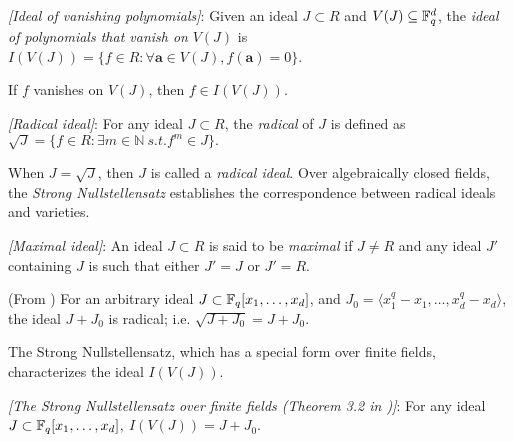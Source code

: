 \begin{Definition}{\it [Ideal of vanishing polynomials]}:
Given an ideal $J\subset R$ and $V(J) \subseteq {\mathbb{F}}_{q}^d$, the {\it ideal
of polynomials that vanish on} $V(J)$ is $I(V(J)) = \{ f \in R :
\forall \bm{a} \in V(J), f(\bm{a}) = 0\}$.
\end{Definition}

If $f$ vanishes on $V(J)$, then $f \in I(V(J))$. 

\begin{Definition}{\it [Radical ideal]}:
For any ideal $J\subset R$, the {\it radical} of $J$ is defined
as $\sqrt{J} = \{f \in R: \exists m \in \mathbb{N} ~s.t. f^m \in J\}.$
\end{Definition}

When $J = \sqrt{J}$, then $J$ is called a {\it radical ideal}.
Over algebraically closed fields, the {\it Strong Nullstellensatz}
establishes the correspondence between radical ideals and varieties. 

\begin{Definition}{\it [Maximal ideal]}: An ideal $J\subset R$ is 
said to be {\it maximal} if $J \neq R$ and any
ideal $J'$ containing $J$ is such that either $J'=J$ or $J'=R$.
\end{Definition}

\begin{Lemma}
\label{lemma:radical-ff}
(From \cite{gao:qe-gf-gb}) For an arbitrary ideal $J\subset
{\mathbb{F}}_{q}[x_1,\dots,x_d]$, and  $J_0 = \langle
x_1^q-x_1,\dots,x_d^q  -  x_d\rangle$, the ideal $J + J_0$ is radical;  
i.e. $\sqrt{J+J_0} = J+J_0$. 
\end{Lemma}

The Strong Nullstellensatz, which has a special form over finite fields,
characterizes the ideal $I(V(J))$.

\begin{Theorem}{\it [The Strong Nullstellensatz over finite fields
(Theorem 3.2 in \cite{gao:qe-gf-gb})]}: \label{thm:strong-ns}  
For any ideal $J \subset {\mathbb{F}}_{q}[x_1,\dots,x_d]$$, ~I(V(J)) = J + J_0$.
\end{Theorem}


